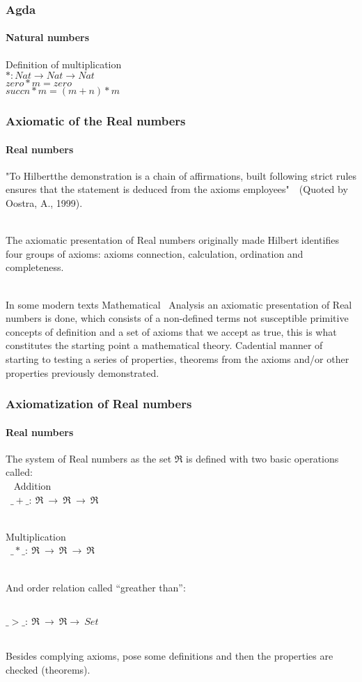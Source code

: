 \documentclass{beamer}
\begin{document}
\begin{frame}
\frametitle{Agda}
\framesubtitle{Natural numbers}
{ \rm Definition of multiplication \\
$* : Nat \to Nat \to Nat$\\
$zero  * m = zero$\\
$succ n * m = (m + n) * m$\\
}
\end{frame}

\begin{frame}
\frametitle{Axiomatic of the Real numbers}
\framesubtitle{Real numbers}

{ \rm "To Hilbertthe demonstration is a chain of affirmations,
built following strict rules ensures that the statement is deduced
from the axioms employees"~\ (Quoted by Oostra, A., 1999).}\\\

{ \rm The axiomatic presentation of Real numbers originally made
Hilbert identifies four groups of axioms: axioms connection,
calculation, ordination and completeness.}\\\

{ \rm In some modern texts Mathematical~\cite{Rosenlicht} Analysis an axiomatic presentation of Real
numbers is done, which consists of a non-defined terms not susceptible
primitive concepts of definition and a set of axioms that we accept as
true, this is what constitutes the starting point a mathematical
theory. Cadential manner of starting to testing a series of
properties, theorems from the axioms and/or other properties
previously demonstrated.
}
\end{frame}

\begin{frame}
\frametitle{Axiomatization of Real numbers}
\framesubtitle{Real numbers}

{ \rm The system of Real numbers as the set $\Re$ is defined with two
basic operations called:\\\
}
Addition\\\
$\_ +\_ : ~\Re ~\to ~\Re ~\to ~\Re$\\\

Multiplication\\\
$\_*\_ : ~\Re ~\to ~\Re ~\to ~\Re$\\\

And order relation called ``greather than'':\\\

$\_>\_ : ~\Re ~\to ~\Re \to ~Set$\\\

{ \rm Besides complying axioms, pose some
definitions and then the properties are checked (theorems).
}
\end{frame}
\end{document}
